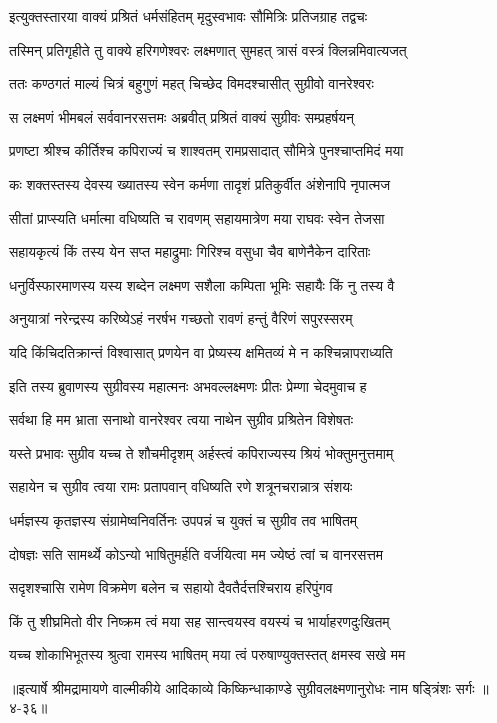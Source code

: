 
\twolineshloka
{इत्युक्तस्तारया वाक्यं प्रश्रितं धर्मसंहितम्}
{मृदुस्वभावः सौमित्रिः प्रतिजग्राह तद्वचः} %

\twolineshloka
{तस्मिन् प्रतिगृहीते तु वाक्ये हरिगणेश्वरः}
{लक्ष्मणात् सुमहत् त्रासं वस्त्रं क्लिन्नमिवात्यजत्} %

\twolineshloka
{ततः कण्ठगतं माल्यं चित्रं बहुगुणं महत्}
{चिच्छेद विमदश्चासीत् सुग्रीवो वानरेश्वरः} %

\twolineshloka
{स लक्ष्मणं भीमबलं सर्ववानरसत्तमः}
{अब्रवीत् प्रश्रितं वाक्यं सुग्रीवः सम्प्रहर्षयन्} %

\twolineshloka
{प्रणष्टा श्रीश्च कीर्तिश्च कपिराज्यं च शाश्वतम्}
{रामप्रसादात् सौमित्रे पुनश्चाप्तमिदं मया} %

\twolineshloka
{कः शक्तस्तस्य देवस्य ख्यातस्य स्वेन कर्मणा}
{तादृशं प्रतिकुर्वीत अंशेनापि नृपात्मज} %

\twolineshloka
{सीतां प्राप्स्यति धर्मात्मा वधिष्यति च रावणम्}
{सहायमात्रेण मया राघवः स्वेन तेजसा} %

\twolineshloka
{सहायकृत्यं किं तस्य येन सप्त महाद्रुमाः}
{गिरिश्च वसुधा चैव बाणेनैकेन दारिताः} %

\twolineshloka
{धनुर्विस्फारमाणस्य यस्य शब्देन लक्ष्मण}
{सशैला कम्पिता भूमिः सहायैः किं नु तस्य वै} %

\twolineshloka
{अनुयात्रां नरेन्द्रस्य करिष्येऽहं नरर्षभ}
{गच्छतो रावणं हन्तुं वैरिणं सपुरस्सरम्} %

\twolineshloka
{यदि किंचिदतिक्रान्तं विश्वासात् प्रणयेन वा}
{प्रेष्यस्य क्षमितव्यं मे न कश्चिन्नापराध्यति} %

\twolineshloka
{इति तस्य ब्रुवाणस्य सुग्रीवस्य महात्मनः}
{अभवल्लक्ष्मणः प्रीतः प्रेम्णा चेदमुवाच ह} %

\twolineshloka
{सर्वथा हि मम भ्राता सनाथो वानरेश्वर}
{त्वया नाथेन सुग्रीव प्रश्रितेन विशेषतः} %

\twolineshloka
{यस्ते प्रभावः सुग्रीव यच्च ते शौचमीदृशम्}
{अर्हस्त्वं कपिराज्यस्य श्रियं भोक्तुमनुत्तमाम्} %

\twolineshloka
{सहायेन च सुग्रीव त्वया रामः प्रतापवान्}
{वधिष्यति रणे शत्रूनचरान्नात्र संशयः} %

\twolineshloka
{धर्मज्ञस्य कृतज्ञस्य संग्रामेष्वनिवर्तिनः}
{उपपन्नं च युक्तं च सुग्रीव तव भाषितम्} %

\twolineshloka
{दोषज्ञः सति सामर्थ्ये कोऽन्यो भाषितुमर्हति}
{वर्जयित्वा मम ज्येष्ठं त्वां च वानरसत्तम} %

\twolineshloka
{सदृशश्चासि रामेण विक्रमेण बलेन च}
{सहायो दैवतैर्दत्तश्चिराय हरिपुंगव} %

\twolineshloka
{किं तु शीघ्रमितो वीर निष्क्रम त्वं मया सह}
{सान्त्वयस्व वयस्यं च भार्याहरणदुःखितम्} %

\twolineshloka
{यच्च शोकाभिभूतस्य श्रुत्वा रामस्य भाषितम्}
{मया त्वं परुषाण्युक्तस्तत् क्षमस्व सखे मम} %


॥इत्यार्षे श्रीमद्रामायणे वाल्मीकीये आदिकाव्ये किष्किन्धाकाण्डे सुग्रीवलक्ष्मणानुरोधः नाम षड्त्रिंशः सर्गः ॥४-३६॥
